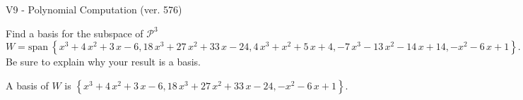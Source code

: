 \begin{exercise}
  \begin{exerciseTitle}V9 - Polynomial Computation (ver. 576)\end{exerciseTitle}
  \begin{exerciseStatement}
    Find a basis for the subspace of \(\mathcal{P}^3\) 
\[W=\mathrm{span}\ \left\{x^{3} + 4 \, x^{2} + 3 \, x - 6 , 18 \, x^{3} + 27 \, x^{2} + 33 \, x - 24 , 4 \, x^{3} + x^{2} + 5 \, x + 4 , -7 \, x^{3} - 13 \, x^{2} - 14 \, x + 14 , -x^{2} - 6 \, x + 1\right\}.\]
 Be sure to explain why your result is a basis.


  \end{exerciseStatement}
  \begin{exerciseAnswer}
   A basis of \(W\) is  \(\left\{x^{3} + 4 \, x^{2} + 3 \, x - 6 , 18 \, x^{3} + 27 \, x^{2} + 33 \, x - 24 , -x^{2} - 6 \, x + 1\right\}\).
  


  \end{exerciseAnswer}
\end{exercise}